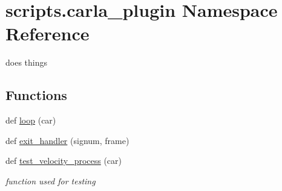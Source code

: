 \hypertarget{namespacescripts_1_1carla__plugin}{}\section{scripts.\+carla\+\_\+plugin Namespace Reference}
\label{namespacescripts_1_1carla__plugin}


does things  


\subsection*{Functions}
\begin{DoxyCompactItemize}
\item 
def \hyperlink{namespacescripts_1_1carla__plugin_a23dd1a2cff4ea023f7d9a2ebad524014}{loop} (car)
\item 
def \hyperlink{namespacescripts_1_1carla__plugin_a779dc6d947f91025ecee9c1a340c98de}{exit\+\_\+handler} (signum, frame)
\item 
def \hyperlink{namespacescripts_1_1carla__plugin_a6d9a5090669749d928df2f9af020588f}{test\+\_\+velocity\+\_\+process} (car)
\begin{DoxyCompactList}\small\item\em function used for testing \end{DoxyCompactList}\end{DoxyCompactItemize}
